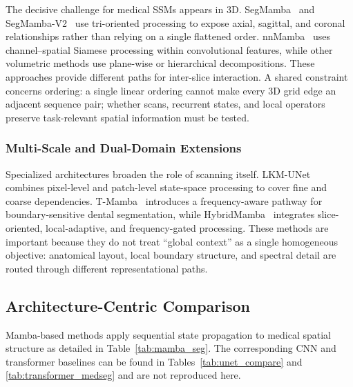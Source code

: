 \documentclass[5p,times,authoryear]{elsarticle}
\begin{document}
The decisive challenge for medical SSMs appears in 3D. SegMamba~\citep{xing2024segmamba} and SegMamba-V2~\citep{xing2025segmamba} use tri-oriented processing to expose axial, sagittal, and coronal relationships rather than relying on a single flattened order. nnMamba~\citep{gong2025nnmamba} uses channel--spatial Siamese processing within convolutional features, while other volumetric methods use plane-wise or hierarchical decompositions. These approaches provide different paths for inter-slice interaction. A shared constraint concerns ordering: a single linear ordering cannot make every 3D grid edge an adjacent sequence pair; whether scans, recurrent states, and local operators preserve task-relevant spatial information must be tested.

\subsubsection{Multi-Scale and Dual-Domain Extensions}

Specialized architectures broaden the role of scanning itself. LKM-UNet~\citep{wang2024lkm} combines pixel-level and patch-level state-space processing to cover fine and coarse dependencies. T-Mamba~\citep{hao2026t} introduces a frequency-aware pathway for boundary-sensitive dental segmentation, while HybridMamba~\citep{wu2025hybridmamba} integrates slice-oriented, local-adaptive, and frequency-gated processing. These methods are important because they do not treat ``global context'' as a single homogeneous objective: anatomical layout, local boundary structure, and spectral detail are routed through different representational paths.


\subsection{Architecture-Centric Comparison}


Mamba-based methods apply sequential state propagation to medical spatial structure as detailed in Table~\ref{tab:mamba_seg}. The corresponding CNN and transformer baselines can be found in Tables~\ref{tab:unet_compare} and \ref{tab:transformer_medseg} and are not reproduced here.
\end{document}
